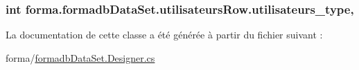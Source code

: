 \subsubsection[{\texorpdfstring{utilisateurs\+\_\+type}{utilisateurs_type}}]{\setlength{\rightskip}{0pt plus 5cm}int forma.\+formadb\+Data\+Set.\+utilisateurs\+Row.\+utilisateurs\+\_\+type\hspace{0.3cm}{\ttfamily [get]}, {\ttfamily [set]}}\hypertarget{classforma_1_1formadb_data_set_1_1utilisateurs_row_a0e0006a8fca04d95b3040962f26c02b5}{}\label{classforma_1_1formadb_data_set_1_1utilisateurs_row_a0e0006a8fca04d95b3040962f26c02b5}


La documentation de cette classe a été générée à partir du fichier suivant \+:\begin{DoxyCompactItemize}
\item 
forma/\hyperlink{formadb_data_set_8_designer_8cs}{formadb\+Data\+Set.\+Designer.\+cs}\end{DoxyCompactItemize}
